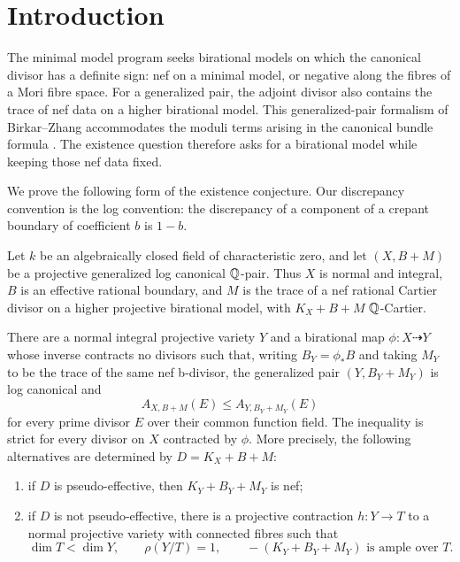 \section{Introduction}\label{sec:introduction}

The minimal model program seeks birational models on which the canonical
divisor has a definite sign: nef on a minimal model, or negative along the
fibres of a Mori fibre space. For a generalized pair, the adjoint divisor
also contains the trace of nef data on a higher birational model. This
generalized-pair formalism of Birkar--Zhang
\cite[Definition~1.4]{BirkarZhang} accommodates the moduli terms arising
in the canonical bundle formula \cite{AmbroCBF}. The existence question
therefore asks for a birational model while keeping those nef data fixed.

We prove the following form of the existence conjecture. Our discrepancy
convention is the log convention: the discrepancy of a component of a
crepant boundary of coefficient $b$ is $1-b$.

\begin{theorem}\label{thm:main}
Let $k$ be an algebraically closed field of characteristic zero, and let
$(X,B+M)$ be a projective generalized log canonical $\mathbb Q$-pair. Thus $X$ is
normal and integral, $B$ is an effective rational boundary, and $M$ is the
trace of a nef rational Cartier divisor on a higher projective birational
model, with $K_X+B+M$ $\mathbb Q$-Cartier.

There are a normal integral projective variety $Y$ and a birational map
$\phi\colon X\dashrightarrow Y$ whose inverse contracts no divisors such
that, writing $B_Y=\phi_*B$ and taking $M_Y$ to be the trace of the same
nef b-divisor, the generalized pair $(Y,B_Y+M_Y)$ is log canonical and
\[
 A_{X,B+M}(E)\le A_{Y,B_Y+M_Y}(E)
\]
for every prime divisor $E$ over their common function field. The
inequality is strict for every divisor on $X$ contracted by $\phi$.
More precisely, the following alternatives are determined by $D=K_X+B+M$:
\begin{enumerate}
\item if $D$ is pseudo-effective, then $K_Y+B_Y+M_Y$ is nef;
\item if $D$ is not pseudo-effective, there is a projective contraction $h\colon Y\to T$ to a normal
projective variety with connected fibres such that
\[
 \dim T<\dim Y,\qquad \rho(Y/T)=1,
 \qquad -(K_Y+B_Y+M_Y)\text{ is ample over }T.
\]
\end{enumerate}
\end{theorem}

